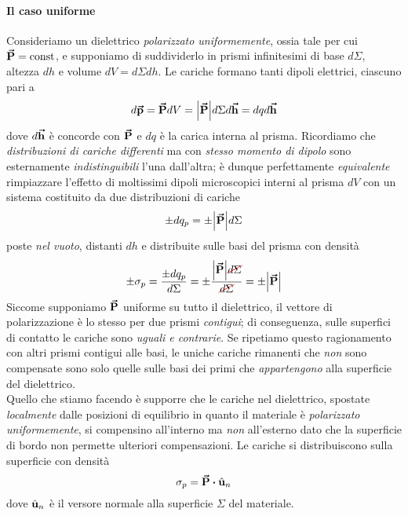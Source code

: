 \paragraph{Il caso uniforme}
Consideriamo un dielettrico \textit{polarizzato uniformemente}, ossia tale per cui $\vb*{\va{P}}=\text{const}$, e supponiamo di suddividerlo in prismi infinitesimi di base $d\Sigma$, altezza $dh$ e volume $dV=d\Sigma dh$. Le cariche formano tanti dipoli elettrici, ciascuno pari a
\begin{equation*}
	d\vb*{\va{p}}=\vb*{\va{P}}dV=\abs{\vb*{\va{P}}}d\Sigma d\vb*{\va{h}}=dqd\vb*{\va{h}}
\end{equation*}
dove $d\vb*{\va{h}}$ è concorde con $\vb*{\va{P}}$ e $dq$ è la carica interna al prisma. Ricordiamo che \textit{distribuzioni di cariche differenti} ma con \textit{stesso momento di dipolo} sono esternamente \textit{indistinguibili} l'una dall'altra; è dunque perfettamente \textit{equivalente} rimpiazzare l'effetto di moltissimi dipoli microscopici interni al prisma $dV$ con un sistema costituito da due distribuzioni di cariche
\begin{equation*}
	\pm dq_p=\pm \abs{\vb*{\va{P}}}d\Sigma
\end{equation*}
poste \textit{nel vuoto}, distanti $dh$ e distribuite sulle basi del prisma con densità
\begin{equation*}
	\pm\sigma_p=\frac{\pm dq_p}{d\Sigma}=\pm\frac{\abs{\vba{P}}\Ccancel[red]{d\Sigma}}{\Ccancel[red]{d\Sigma}}=\pm\abs{\vba{P}}
\end{equation*}
Siccome supponiamo $\vb*{\va{P}}$ uniforme su tutto il dielettrico, il vettore di polarizzazione è lo stesso per due prismi \textit{contigui}; di conseguenza, sulle superfici di contatto le cariche sono \textit{uguali e contrarie}. Se ripetiamo questo ragionamento con altri prismi contigui alle basi, le uniche cariche rimanenti che \textit{non} sono compensate sono solo quelle sulle basi dei primi che \textit{appartengono} alla superficie del dielettrico.\\
Quello che stiamo facendo è supporre che le cariche nel dielettrico, spostate \textit{localmente} dalle posizioni di equilibrio in quanto il materiale è \textit{polarizzato uniformemente}, si compensino all'interno ma \textit{non} all'esterno dato che la superficie di bordo non permette ulteriori compensazioni. Le cariche si distribuiscono sulla superficie con densità
\begin{equation}
	\sigma_p=\vba{P}\vdot \vbh{u}_n
\end{equation}
dove $\hat{\mathbf{u}}_n$ è il versore normale alla superficie $\Sigma$ del materiale.
